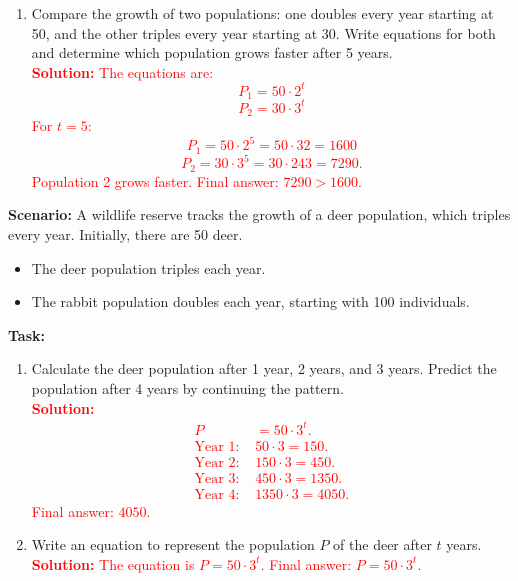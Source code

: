 \documentclass[9pt]{article}
\begin{document}
\begin{tcolorbox}[colframe=black!60, colback=white, 
coltitle=black, colbacktitle=black!15, fonttitle=\bfseries\Large, 
title=Problems, halign title=center, left=10pt, right=10pt, top=10pt, bottom=80pt]
\begin{enumerate}[start=10, itemsep=4em]
    \item Compare the growth of two populations: one doubles every year starting at 50, and the other triples every year starting at 30. Write equations for both and determine which population grows faster after 5 years.\\
    \textcolor{red}{\textbf{Solution:} The equations are:
    \[P_1 = 50 \cdot 2^t\] 
    \[P_2 = 30 \cdot 3^t\]
    For \(t = 5\): 
    \[P_1 = 50 \cdot 2^5 = 50 \cdot 32 = 1600\] 
    \[P_2 = 30 \cdot 3^5 = 30 \cdot 243 = 7290.\]
    Population 2 grows faster. Final answer: \(7290 > 1600\).}
\end{enumerate}
\end{tcolorbox}

\vspace{1em}
\begin{tcolorbox}[colframe=black!60, colback=white, 
coltitle=black, colbacktitle=black!15, fonttitle=\bfseries\Large, 
title=Performance Task: Predicting Population Growth, halign title=center, left=10pt, right=10pt, top=10pt, bottom=50pt]
\textbf{Scenario:} A wildlife reserve tracks the growth of a deer population, which triples every year. Initially, there are 50 deer.
\begin{itemize}
    \item The deer population triples each year.
    \item The rabbit population doubles each year, starting with 100 individuals.
\end{itemize}
\textbf{Task:}
\begin{enumerate}[itemsep=3em]
    \item Calculate the deer population after 1 year, 2 years, and 3 years. Predict the population after 4 years by continuing the pattern.\\
    \textcolor{red}{\textbf{Solution:} 
    \begin{align*}
    P &= 50 \cdot 3^t. \\
    \text{Year 1: } & 50 \cdot 3 = 150. \\
    \text{Year 2: } & 150 \cdot 3 = 450. \\
    \text{Year 3: } & 450 \cdot 3 = 1350. \\
    \text{Year 4: } & 1350 \cdot 3 = 4050.
    \end{align*}
    Final answer: \(4050\).}

    \item Write an equation to represent the population \(P\) of the deer after \(t\) years.\\
    \textcolor{red}{\textbf{Solution:} The equation is \(P = 50 \cdot 3^t\). Final answer: \(P = 50 \cdot 3^t\).}


\end{enumerate}
\end{tcolorbox}
\end{document}
